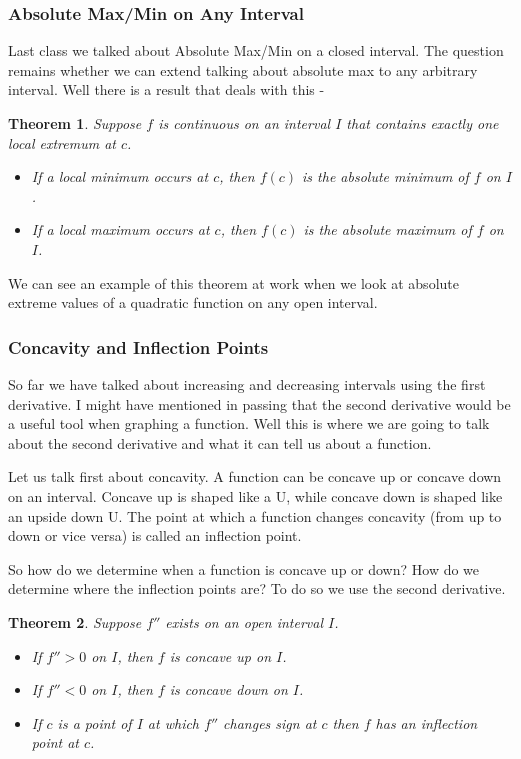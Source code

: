 \documentclass[12pt,reqno]{article}
\newtheorem{Theorem}{Theorem}
\theoremstyle{definition}
\begin{document}
\subsubsection{Absolute Max/Min on Any Interval}
Last class we talked about Absolute Max/Min on a closed interval. The question remains whether we can extend talking about absolute max to any arbitrary interval. Well there is a result that deals with this - 
\begin{Theorem}
	Suppose $f$ is continuous on an interval $I$ that contains exactly one local extremum at $c$. 
	\begin{itemize}
		\item If a local minimum occurs at $c$, then $f(c)$ is the absolute minimum of $f$ on $I$. 
		\item If a local maximum occurs at $c$, then $f(c)$ is the absolute maximum of $f$ on $I$. 
	\end{itemize}
\end{Theorem}

We can see an example of this theorem at work when we look at absolute extreme values of a quadratic function on any open interval. 

\subsubsection{Concavity and Inflection Points}

So far we have talked about increasing and decreasing intervals using the first derivative. I might have mentioned in passing that the second derivative would be a useful tool when graphing a function. Well this is where we are going to talk about the second derivative and what it can tell us about a function. 

Let us talk first about concavity. A function can be concave up or concave down on an interval. Concave up is shaped like a U, while concave down is shaped like an upside down U. The point at which a function changes concavity (from up to down or vice versa) is called an inflection point. 

So how do we determine when a function is concave up or down? How do we determine where the inflection points are? To do so we use the second derivative. 
\begin{Theorem}
	Suppose $f''$ exists on an open interval $I$. 
	\begin{itemize}
		\item If $f'' > 0$ on $I$, then $f$ is concave up on $I$. 
		\item If $f'' < 0$ on $I$, then $f$ is concave down on $I$. 
		\item If $c$ is a point of $I$ at which $f''$ changes sign at $c$ then $f$ has an inflection point at $c$. 
	\end{itemize}
\end{Theorem}
\end{document}
